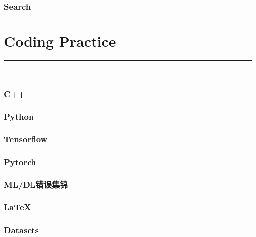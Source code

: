 \documentclass{article}
\begin{document}
\section{Search}



\clearpage
\part{Coding Practice}
{\noindent}	 \rule[-10pt]{17.5cm}{0.5em}\\

\section{C++}


\section{Python}


\section{Tensorflow}


\section{Pytorch}


\section{ML/DL错误集锦}

%
\section{\LaTeX}


\section{Datasets}

\end{document}
